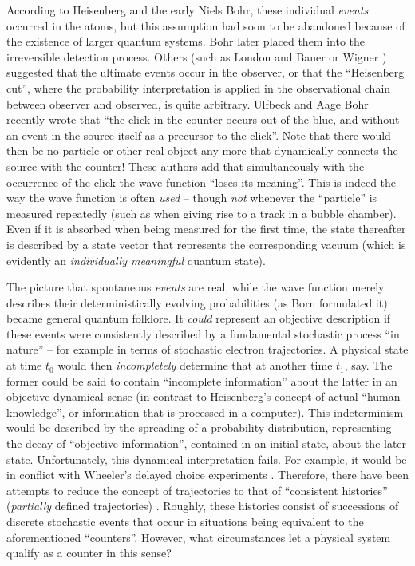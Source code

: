According to Heisenberg and the
early Niels Bohr, these individual {\it events} occurred in the atoms,
but this assumption had soon to be abandoned because of the existence
of larger quantum systems. Bohr later placed them into the
irreversible detection process. Others (such as London and Bauer
\cite{London} or Wigner
\cite{Wigner}) suggested that the ultimate events occur in the
observer, or that the ``Heisenberg cut'', where the probability
interpretation is applied in the observational chain between observer
and observed, is quite arbitrary. Ulfbeck and Aage Bohr \cite{UB}
recently wrote that ``the click  in the counter occurs out of the
blue, and without an event in the source itself as a precursor to the
click''. Note that there would then be no particle or other real
object any more that dynamically connects the source with the counter!
These authors add that simultaneously with the occurrence of the
click the wave function ``loses its meaning''. This is indeed the way
the wave function is often {\it used} -- though {\it not} whenever the
``particle'' is measured repeatedly (such as when giving rise to a
track in a bubble chamber). Even if it is absorbed when being measured
for the first time, the state thereafter is
described by a state vector that represents the
corresponding vacuum (which is evidently an {\it individually
meaningful} quantum state).


The picture that spontaneous {\it
events} are real, while the wave function merely describes their
deterministically evolving probabilities (as Born formulated
it) became general quantum folklore. It {\it could} represent an
objective description if these events were consistently described
by a fundamental stochastic process ``in nature'' -- for example in
terms of stochastic electron trajectories. A physical state at time
$t_0$ would then {\it incompletely} determine that at another time
$t_1$, say. The former could be said to contain ``incomplete
information'' about the latter in an objective dynamical sense (in
contrast to Heisenberg's concept of actual ``human knowledge'', or
information that is processed in a computer). This indeterminism would
be described by the spreading of a probability distribution,
representing the decay of ``objective information'', contained in an
initial state, about the later state. Unfortunately, this dynamical
interpretation fails. For example, it would be in conflict with
Wheeler's delayed choice experiments
\cite{frontiers}. Therefore, there have been attempts to reduce the
concept of trajectories to that of ``consistent
histories'' ({\it partially} defined trajectories)
\cite{Griffiths}. Roughly, these histories consist of successions
of discrete stochastic events that occur in situations being equivalent
to the aforementioned ``counters''. However, what circumstances let a
physical system qualify as a counter in this sense?

